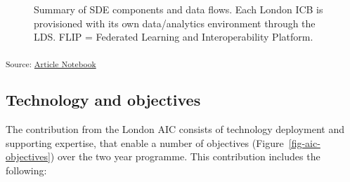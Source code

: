 \documentclass[
  letterpaper,
  DIV=11,
  numbers=noendperiod]{scrartcl}
\begin{document}
\begin{figure}


\caption{\label{fig-sde-summary}Summary of SDE components and data
flows. Each London ICB is provisioned with its own data/analytics
environment through the LDS. FLIP = Federated Learning and
Interoperability Platform.}

\end{figure}%

\textsubscript{Source:
\href{https://d3london.github.io/sde_aic_phase0/index.qmd.html}{Article
Notebook}}

\subsection{Technology and objectives}\label{technology-and-objectives}

The contribution from the London AIC consists of technology deployment
and supporting expertise, that enable a number of objectives
(Figure~\ref{fig-aic-objectives}) over the two year programme. This
contribution includes the following:
\end{document}
